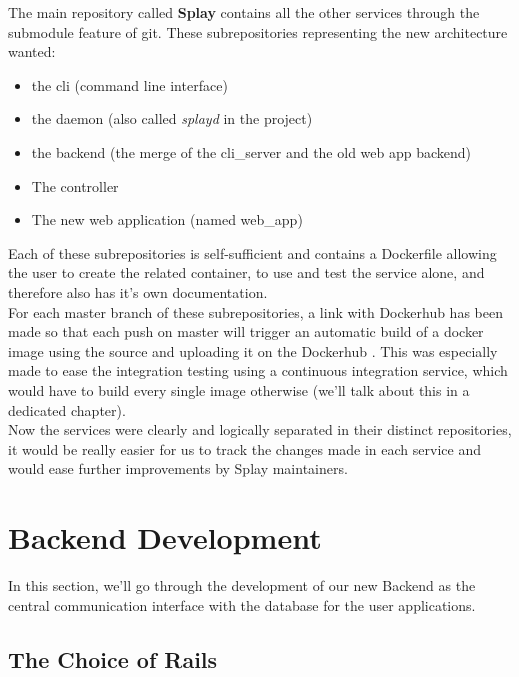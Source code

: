 \documentclass{eplmastersthesis}
\begin{document}
        The main repository called \textbf{Splay} contains all the other services
        through the submodule \cite{GitSubmodules} feature of git. These
        subrepositories representing the new architecture wanted:

        \begin{itemize}
          \item the cli (command line interface)
          \item the daemon (also called \textit{splayd} in the project)
          \item the backend (the merge of the cli\_server and the old web app backend)
          \item The controller
          \item The new web application (named web\_app)
        \end{itemize}

        Each of these subrepositories is self-sufficient and contains a Dockerfile
        allowing the user to create the related container, to use and test
        the service alone, and therefore also has it's own documentation.\\

        For each master branch of these subrepositories, a link with Dockerhub
        has been made so that each push on master will trigger an automatic build
        of a docker image using the source and uploading it on the Dockerhub
        \cite{DockerHubGithub}.
        This was especially made to ease the integration testing using a
        continuous integration service, which would have to build every single
        image otherwise (we'll talk about this in a dedicated chapter).\\

        Now the services were clearly and logically separated in their
        distinct repositories, it would be really easier for us to track
        the changes made in each service and would ease further improvements
        by Splay maintainers.

    \section{Backend Development}

      In this section, we'll go through the development of our new Backend
      as the central communication interface with the database for the user
      applications.\\

      \subsection{The Choice of Rails}
\end{document}
